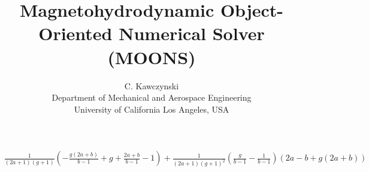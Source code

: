 \documentclass[11pt]{article}
\begin{document}
\doublespacing
\title{Magnetohydrodynamic Object-Oriented Numerical Solver (MOONS)}
\author{C. Kawczynski \\
Department of Mechanical and Aerospace Engineering \\
University of California Los Angeles, USA\\
}
\maketitle

  
\begin{equation}\begin{aligned}
\frac{1}{\left(2 a + 1\right) \left(g + 1\right)} \left(- \frac{g \left(2 a + b\right)}{b - 1} + g + \frac{2 a + b}{b - 1} - 1\right) + \frac{1}{\left(2 a + 1\right) \left(g + 1\right)^{2}} \left(\frac{g}{b - 1} - \frac{1}{b - 1}\right) \left(2 a - b + g \left(2 a + b\right)\right)
\end{aligned}\end{equation}
 
\end{document}
